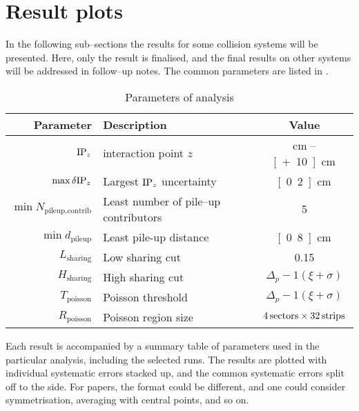 \section{Result plots} 
\label{sec:results}

In the following sub--sections the \ndndeta{} results for some
collision systems will be presented.  Here, only the \PbPbCol{} result
is finalised, and the final results on other systems will be addressed
in follow--up notes.  The common parameters are listed in
.


\begin{table}
  \caption{Parameters of analysis}
  \label{tab:common:params}
  \centering
  \begin{tabular}[t]{|rlc|}
    \hline
    \headColor{} 
    \textbf{Parameter}
    & \textbf{Description}
    & \textbf{Value}\\
    \hline 
    $\IPz$ 
    & interaction point $z$ 
    & \unit[-10]{cm} -- \unit[+10]{cm}\\
    \altRowColor{}
    $\max{\delta\IPz}$ 
    & Largest $\IPz$ uncertainty 
    & \unit[0.2]{cm}\\
    $\min{N_{\text{pileup,contrib}}}$ 
    & Least number of pile--up contributors 
    & 5\\
    \altRowColor{}
    $\min{d_{\text{pileup}}}$ 
    & Least pile-up distance 
    & \unit[0.8]{cm}\\
    \hline 
    $L_{\text{sharing}}$ 
    & Low sharing cut 
    & 0.15\\
    \altRowColor{}
    $H_{\text{sharing}}$ 
    & High sharing cut 
    & $\Delta_p-1(\xi+\sigma)$ \\
    $T_{\text{poisson}}$ 
    & Poisson threshold 
    & $\Delta_p-1(\xi+\sigma)$ \\
    \altRowColor{}
    $R_{\text{poisson}}$ 
    & Poisson region size 
    & $\unit[4]{sectors} \times \unit[32]{strips}$\\
    \hline 
  \end{tabular}
\end{table}


Each result is accompanied by a summary table of parameters used in
the particular analysis, including the selected runs.  The results are
plotted with individual systematic errors stacked up, and the common
systematic errors split off to the side.  For papers, the format could
be different, and one could consider symmetrisation, averaging with
central points,  and so on. 


